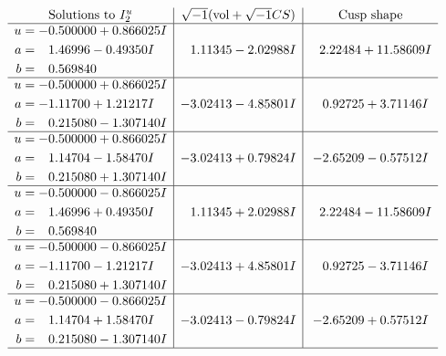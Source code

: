 \documentclass[1p]{elsarticle_modified}
\theoremstyle{definition}
\newcommand{\I}{\sqrt{-1}}
\begin{document}
$$\begin{array}{c|c|c}  
\text{Solutions to }I^u_{2}& \I (\text{vol} + \sqrt{-1}CS) & \text{Cusp shape}\\
 \hline 
\begin{aligned}
u &= -0.500000 + 0.866025 I \\
a &= \phantom{-}1.46996 - 0.49350 I \\
b &= \phantom{-}0.569840\phantom{ +0.000000I}\end{aligned}
 & \phantom{-}1.11345 - 2.02988 I & \phantom{-}2.22484 + 11.58609 I \\ \hline\begin{aligned}
u &= -0.500000 + 0.866025 I \\
a &= -1.11700 + 1.21217 I \\
b &= \phantom{-}0.215080 - 1.307140 I\end{aligned}
 & -3.02413 - 4.85801 I & \phantom{-}0.92725 + 3.71146 I \\ \hline\begin{aligned}
u &= -0.500000 + 0.866025 I \\
a &= \phantom{-}1.14704 - 1.58470 I \\
b &= \phantom{-}0.215080 + 1.307140 I\end{aligned}
 & -3.02413 + 0.79824 I & -2.65209 - 0.57512 I \\ \hline\begin{aligned}
u &= -0.500000 - 0.866025 I \\
a &= \phantom{-}1.46996 + 0.49350 I \\
b &= \phantom{-}0.569840\phantom{ +0.000000I}\end{aligned}
 & \phantom{-}1.11345 + 2.02988 I & \phantom{-}2.22484 - 11.58609 I \\ \hline\begin{aligned}
u &= -0.500000 - 0.866025 I \\
a &= -1.11700 - 1.21217 I \\
b &= \phantom{-}0.215080 + 1.307140 I\end{aligned}
 & -3.02413 + 4.85801 I & \phantom{-}0.92725 - 3.71146 I \\ \hline\begin{aligned}
u &= -0.500000 - 0.866025 I \\
a &= \phantom{-}1.14704 + 1.58470 I \\
b &= \phantom{-}0.215080 - 1.307140 I\end{aligned}
 & -3.02413 - 0.79824 I & -2.65209 + 0.57512 I\\
 \hline 
 \end{array}$$\newpage\newpage\renewcommand{\arraystretch}{1}
\end{document}
